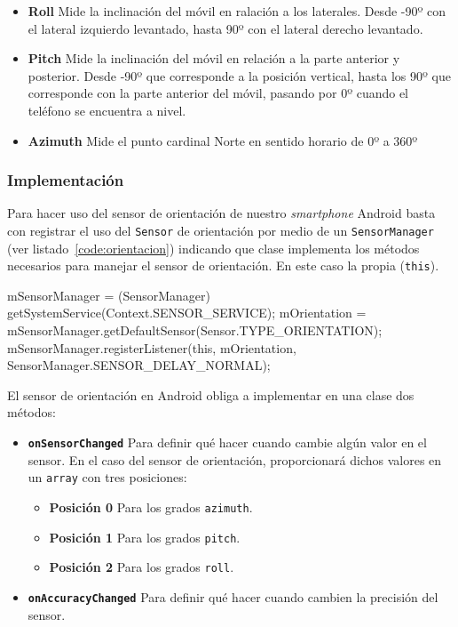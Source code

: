 \begin{itemize}
  \item \textbf{Roll} Mide la inclinación del móvil en ralación a los laterales. Desde -90º con el
    lateral izquierdo levantado, hasta 90º con el lateral derecho levantado.
  \item \textbf{Pitch} Mide la inclinación del móvil en relación a la parte anterior y
    posterior. Desde -90º que corresponde a la posición vertical, hasta los 90º que corresponde con
    la parte anterior del móvil, pasando por 0º cuando el teléfono se encuentra a nivel.
  \item \textbf{Azimuth} Mide el punto cardinal Norte en sentido horario de 0º a 360º
\end{itemize}

\subsubsection{Implementación}

Para hacer uso del sensor de orientación de nuestro \emph{smartphone} Android basta con registrar el
uso del \texttt{Sensor} de orientación por medio de un \texttt{SensorManager} (ver
listado~\ref{code:orientacion}) indicando que clase implementa los métodos necesarios para manejar
el sensor de orientación. En este caso la propia (\texttt{this}).

\begin{listing}[
  float=ht,
  language = java,
  caption  = {Ejemplo de registro de un \texttt{Sensor} de orientación con \texttt{SensorManager}},
  label    = code:orientacion]
mSensorManager = (SensorManager) getSystemService(Context.SENSOR_SERVICE);
mOrientation = mSensorManager.getDefaultSensor(Sensor.TYPE_ORIENTATION);
mSensorManager.registerListener(this, mOrientation, SensorManager.SENSOR_DELAY_NORMAL);
\end{listing}

El sensor de orientación en Android obliga a implementar en una clase dos métodos:

\begin{itemize}
  \item \textbf{\texttt{onSensorChanged}} Para definir qué hacer cuando cambie algún valor en el
    sensor. En el caso del sensor de orientación, proporcionará dichos valores en un \texttt{array}
    con tres posiciones:
    \begin{itemize}
      \item \textbf{Posición 0} Para los grados \texttt{azimuth}.
      \item \textbf{Posición 1} Para los grados \texttt{pitch}.
      \item \textbf{Posición 2} Para los grados \texttt{roll}.
    \end{itemize}
  \item \textbf{\texttt{onAccuracyChanged}} Para definir qué hacer cuando cambien la precisión del
    sensor.
\end{itemize}

